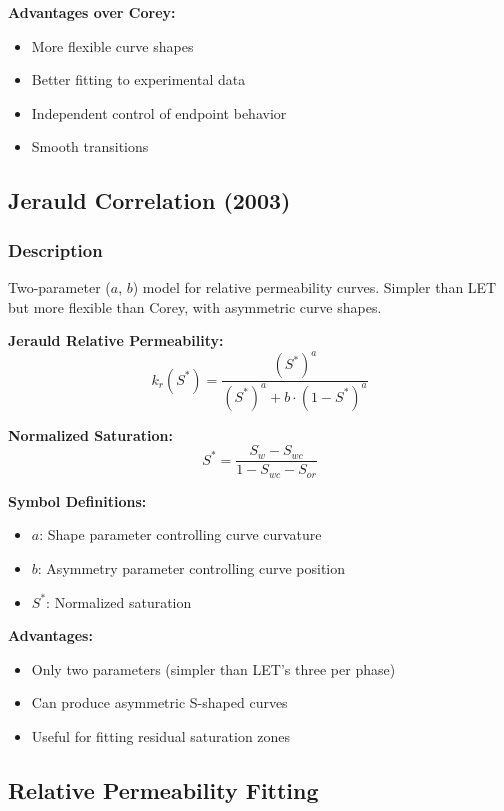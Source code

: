 \documentclass[11pt,a4paper]{article}
\newcommand{\symitem}[2]{\item \textbf{#1}: #2}
\begin{document}
\textbf{Advantages over Corey:}
\begin{itemize}
\item More flexible curve shapes
\item Better fitting to experimental data
\item Independent control of endpoint behavior
\item Smooth transitions
\end{itemize}

\subsection{Jerauld Correlation (2003)}

\subsubsection{Description}
Two-parameter ($a$, $b$) model for relative permeability curves. Simpler than LET but more flexible than Corey, with asymmetric curve shapes.

\begin{tcolorbox}[colback=formulabox,colframe=black!75]
\textbf{Jerauld Relative Permeability:}
\begin{equation}
k_r(S^*) = \frac{(S^*)^a}{(S^*)^a + b \cdot (1 - S^*)^a}
\end{equation}

\textbf{Normalized Saturation:}
\begin{equation}
S^* = \frac{S_w - S_{wc}}{1 - S_{wc} - S_{or}}
\end{equation}
\end{tcolorbox}

\textbf{Symbol Definitions:}
\begin{itemize}[leftmargin=2cm]
\symitem{$a$}{Shape parameter controlling curve curvature}
\symitem{$b$}{Asymmetry parameter controlling curve position}
\symitem{$S^*$}{Normalized saturation}
\end{itemize}

\textbf{Advantages:}
\begin{itemize}
\item Only two parameters (simpler than LET's three per phase)
\item Can produce asymmetric S-shaped curves
\item Useful for fitting residual saturation zones
\end{itemize}

\subsection{Relative Permeability Fitting}
\end{document}
